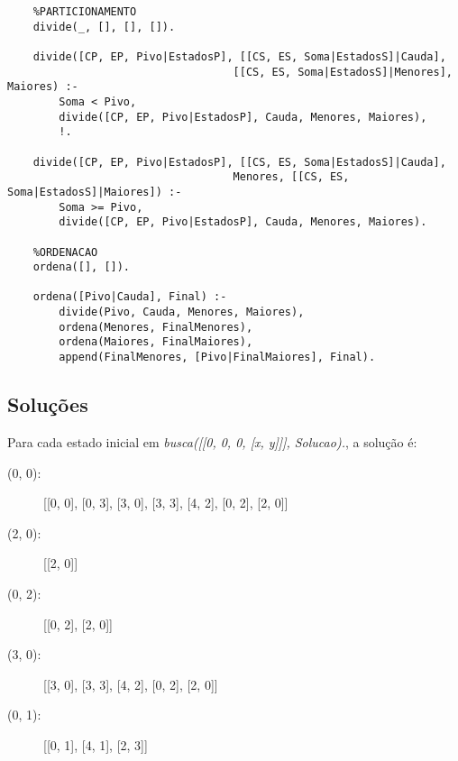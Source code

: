 \documentclass[12pt,a4paper]{article}
\begin{document}
\begin{verbatim}
	%PARTICIONAMENTO
	divide(_, [], [], []).
	
	divide([CP, EP, Pivo|EstadosP], [[CS, ES, Soma|EstadosS]|Cauda], 
	                               [[CS, ES, Soma|EstadosS]|Menores], Maiores) :-
	    Soma < Pivo,
	    divide([CP, EP, Pivo|EstadosP], Cauda, Menores, Maiores),
	    !.
	
	divide([CP, EP, Pivo|EstadosP], [[CS, ES, Soma|EstadosS]|Cauda], 
	                               Menores, [[CS, ES, Soma|EstadosS]|Maiores]) :-
	    Soma >= Pivo,
	    divide([CP, EP, Pivo|EstadosP], Cauda, Menores, Maiores).
	
	%ORDENACAO
	ordena([], []).
	
	ordena([Pivo|Cauda], Final) :-
	    divide(Pivo, Cauda, Menores, Maiores),
	    ordena(Menores, FinalMenores),
	    ordena(Maiores, FinalMaiores),
	    append(FinalMenores, [Pivo|FinalMaiores], Final).
\end{verbatim}

\subsection{Soluções}
Para cada estado inicial em \textit{busca([[0, 0, 0, [x, y]]], Solucao).}, a solução é:
\begin{description}
	\item[(0, 0):] [[0, 0], [0, 3], [3, 0], [3, 3], [4, 2], [0, 2], [2, 0]]	
	\item[(2, 0):] [[2, 0]]
	\item[(0, 2):] [[0, 2], [2, 0]]
	\item[(3, 0):] [[3, 0], [3, 3], [4, 2], [0, 2], [2, 0]]
	\item[(0, 1):] [[0, 1], [4, 1], [2, 3]]	
\end{description}
\end{document}
